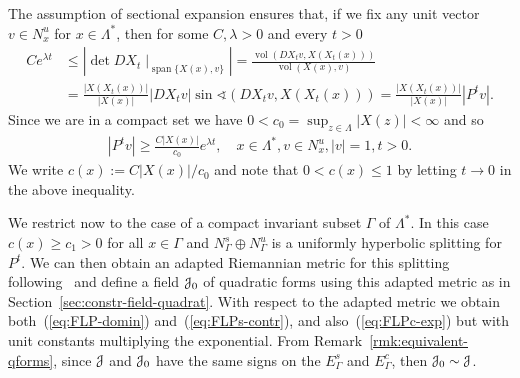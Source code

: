 \documentclass[12pt,reqno]{amsart}
\numberwithin{equation}{section}
\theoremstyle{plain}
\theoremstyle{definition}
\renewcommand{\angle}{\sphericalangle}
\newcommand{\vol}{\operatorname{vol}}
\newcommand{\gen}{\operatorname{span}}
\newcommand{\J}{\EuScript{J}}
\begin{document}
The assumption of sectional expansion ensures that, if we
fix any unit vector $v\in N^u_x$ for $x\in\Lambda^*$, then
for some $C, \lambda>0$ and every $t>0$
\begin{align*}
  Ce^{\lambda t}&\le
  |\det  DX_t\mid_{\gen\{X(x),v\}}|
  =
  \frac{\vol(DX_t v, X(X_t(x)))}{\vol(X(x),v)}
  \\
  &=
  \frac{|X(X_t(x))|}{|X(x)|}|DX_tv|\sin\angle(DX_tv,X(X_t(x)))
  =
  \frac{|X(X_t(x))|}{|X(x)|}|P^tv|.
\end{align*}
Since we are in a compact set we have
$0<c_0=\sup_{z\in\Lambda}|X(z)|<\infty$ and so
\begin{align}\label{eq:FLPc-exp}
  |P^tv|\ge\frac{C|X(x)|}{c_0} e^{\lambda t}, \quad
  x\in\Lambda^*, v\in N^u_x, |v|=1, t>0.
\end{align}
We write $c(x):=C|X(x)|/c_0$ and note that $0<c(x)\le1$ by
letting $t\to0$ in the above inequality.

We restrict now to the case of a compact invariant subset
$\Gamma$ of $\Lambda^*$. In this case $c(x)\ge c_1>0$ for
all $x\in\Gamma$ and $N^s_\Gamma\oplus N^u_\Gamma$ is a
uniformly hyperbolic splitting for $P^t$. We can then obtain
an adapted Riemannian metric for this splitting
following~\cite{Goum07} and define a field $\J_0$ of
quadratic forms using this adapted metric as in
Section~\ref{sec:constr-field-quadrat}. With respect to the
adapted metric we obtain both~(\ref{eq:FLP-domin})
and~(\ref{eq:FLPs-contr}), and also~(\ref{eq:FLPc-exp}) but
with unit constants multiplying the exponential.
From Remark~\ref{rmk:equivalent-qforms}, since $\J$ and
$\J_0$ have the same signs on the $E^s_\Gamma$ and
$E^c_\Gamma$, then $\J_0\sim\J$.
\end{document}
